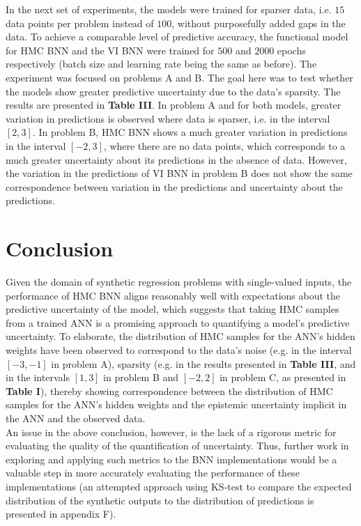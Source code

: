 \documentclass[conference]{IEEEtran}
\begin{document}
In the next set of experiments, the models were trained for sparser data, i.e. $15$ data points per problem instead of $100$, without purposefully added gaps in the data. To achieve a comparable level of predictive accuracy, the functional model for HMC BNN and the VI BNN were trained for $500$ and $2000$ epochs respectively (batch size and learning rate being the same as before). The experiment was focused on problems A and B. The goal here was to test whether the models show greater predictive uncertainty due to the data's sparsity. The results are presented in \textbf{Table III}. In problem A and for both models, greater variation in predictions is observed where data is sparser, i.e. in the interval $[2, 3]$. In problem B, HMC BNN shows a much greater variation in predictions in the interval $[-2, 3]$, where there are no data points, which corresponds to a much greater uncertainty about its predictions in the absence of data. However, the variation in the predictions of VI BNN in problem B does not show the same correspondence between variation in the predictions and uncertainty about the predictions.

\section{Conclusion}
Given the domain of synthetic regression problems with single-valued inputs, the performance of HMC BNN aligns reasonably well with expectations about the predictive uncertainty of the model, which suggests that taking HMC samples from a trained ANN is a promising approach to quantifying a model's predictive uncertainty. To elaborate, the distribution of HMC samples for the ANN's hidden weights have been observed to correspond to the data's noise (e.g. in the interval $[-3, -1]$ in problem A), sparsity (e.g. in the results presented in \textbf{Table III}, and in the intervals $[1, 3]$ in problem B and $[-2, 2]$ in problem C, as presented in \textbf{Table I}), thereby showing correspondence between the distribution of HMC samples for the ANN's hidden weights and the epistemic uncertainty implicit in the ANN and the observed data.\\

An issue in the above conclusion, however, is the lack of a rigorous metric for evaluating the quality of the quantification of uncertainty. Thus, further work in exploring and applying such metrics to the BNN implementations would be a valuable step in more accurately evaluating the performance of these implementations (an attempted approach using KS-test to compare the expected distribution of the synthetic outputs to the distribution of predictions is presented in appendix F).\\
\end{document}
